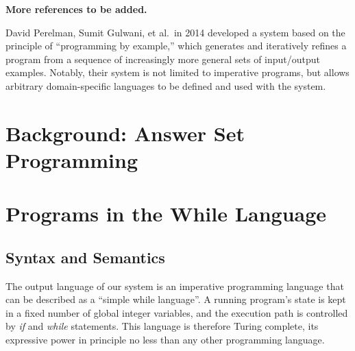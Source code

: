 \documentclass[a4paper,twoside,notitlepage]{report}
\begin{document}
\textbf{More references to be added.}

David Perelman, Sumit Gulwani, et al.\ in 2014 developed a system\cite{tds} 
based on the principle of ``programming by example,'' which generates and 
iteratively refines a program from a sequence of increasingly more general 
sets of input/output examples. Notably, their system is not limited to 
imperative programs, but allows arbitrary domain-specific languages to be 
defined and used with the system.

\chapter{Background: Answer Set Programming} \label{chp:bkgasp}

\chapter{Programs in the While Language} \label{chp:whilan}

\section{Syntax and Semantics}

The output language of our system is an imperative programming language that 
can be described as a ``simple while language''. A running program's state is 
kept in a fixed number of global integer variables, and the execution path is 
controlled by \emph{if} and \emph{while} statements. This language is 
therefore Turing complete, its expressive power in principle no less than any 
other programming language.
\end{document}

